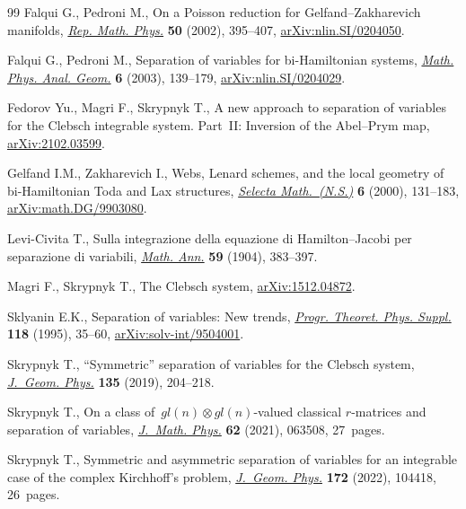 \documentclass[10pt,a4paper]{amsart}
\numberwithin{equation}{section}
\begin{document}
\begin{thebibliography}{99}
Falqui G., Pedroni M., On a {P}oisson reduction for {G}elfand--{Z}akharevich
 manifolds, \href{https://doi.org/10.1016/S0034-4877(02)80068-4}{\textit{Rep.
 Math. Phys.}} \textbf{50} (2002), 395--407,
 \href{http://arxiv.org/abs/nlin.SI/0204050}{arXiv:nlin.SI/0204050}.

Falqui G., Pedroni M., Separation of variables for bi-{H}amiltonian systems,
 \href{https://doi.org/10.1023/A:1024080315471}{\textit{Math. Phys. Anal.
 Geom.}} \textbf{6} (2003), 139--179,
 \href{http://arxiv.org/abs/nlin.SI/0204029}{arXiv:nlin.SI/0204029}.

Fedorov Yu., Magri F., Skrypnyk T., A new approach to separation of variables
 for the {C}lebsch integrable system. Part~{II}: {I}nversion of the
 {A}bel--{P}rym map, \href{http://arxiv.org/abs/2102.03599}{arXiv:2102.03599}.

Gelfand I.M., Zakharevich I., Webs, {L}enard schemes, and the local geometry of
 bi-{H}amiltonian {T}oda and {L}ax structures,
 \href{https://doi.org/10.1007/PL00001387}{\textit{Selecta Math.~(N.S.)}}
 \textbf{6} (2000), 131--183,
 \href{http://arxiv.org/abs/math.DG/9903080}{arXiv:math.DG/9903080}.

Levi-Civita T., Sulla integrazione della equazione di {H}amilton--{J}acobi per
 separazione di variabili,
 \href{https://doi.org/10.1007/BF01445149}{\textit{Math. Ann.}} \textbf{59}
 (1904), 383--397.

Magri F., Skrypnyk T., The {C}lebsch system,
 \href{http://arxiv.org/abs/1512.04872}{arXiv:1512.04872}.

Sklyanin E.K., Separation of variables: {N}ew trends,
 \href{https://doi.org/10.1143/PTPS.118.35}{\textit{Progr. Theoret. Phys.
 Suppl.}} \textbf{118} (1995), 35--60,
 \href{http://arxiv.org/abs/solv-int/9504001}{arXiv:solv-int/9504001}.

Skrypnyk T., ``{S}ymmetric'' separation of variables for the {C}lebsch system,
 \href{https://doi.org/10.1016/j.geomphys.2018.09.014}{\textit{J.~Geom.
 Phys.}} \textbf{135} (2019), 204--218.

Skrypnyk T., On a class of~{$gl(n)\otimes gl(n)$}-valued classical
 {$r$}-matrices and separation of variables,
 \href{https://doi.org/10.1063/5.0041967}{\textit{J.~Math. Phys.}} \textbf{62}
 (2021), 063508, 27~pages.

Skrypnyk T., Symmetric and asymmetric separation of variables for an integrable
 case of the complex {K}irchhoff's problem,
 \href{https://doi.org/10.1016/j.geomphys.2021.104418}{\textit{J.~Geom.
 Phys.}} \textbf{172} (2022), 104418, 26~pages.


\end{thebibliography}
\end{document}
